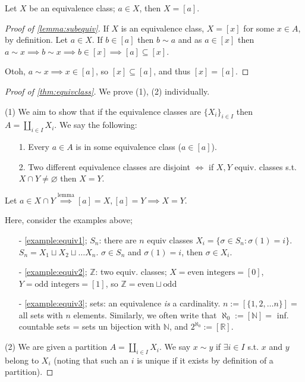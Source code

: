 \documentclass[12pt,oneside]{article}
\begin{document}
\begin{lemma}\label{lemma:subequiv}
  Let $X$ be an equivalence class; $a \in X$, then $X = [a]$.
\end{lemma}
\begin{proof}[Proof of \cref{lemma:subequiv}]
  If $X$ is an equivalence class, $X = [x]$ for some $x \in A$, by definition. Let $a \in X$. If $b \in [a]$ then $b \sim a$ and as $a \in [x]$ then $a \sim x \implies b \sim x \implies b \in [x] \implies [a] \subseteq [x]$.

  Otoh, $a \sim x \implies x \in [a]$, so $[x] \subseteq [a]$, and thus $[x] = [a]$.
\end{proof}

\begin{proof}[Proof of \cref{thm:equivclass}]
  We prove (1), (2) individually.

 (1) We aim to show that if the equivalence classes are $\{X_i\}_{i \in I}$ then $A = \amalg_{i \in I} X_i$. We say the following:
 \begin{itemize}
  \item[1.] Every $a \in A$ is in some equivalence class ($a \in [a]$).
  \item[2.] Two different equivalence classes are disjoint $\iff$ if $X,Y$ equiv. classes s.t. $X \cap Y \ne \varnothing$ then $X = Y$.\footnotemark
 \end{itemize}

 Let $a \in X \cap Y \overset{\text{lemma}}{\implies} [a] = X, [a] = Y \implies X = Y$.

 Here, consider the examples above;
 \begin{itemize}
  \item[-]\cref{example:equiv1}; $S_n$: there are $n$ equiv classes $X_i = \{\sigma \in S_n : \sigma(1) = i\}$. $S_n = X_1 \sqcup X_2 \sqcup \dots X_n$. $\sigma \in S_n$ and $\sigma(1) = i$, then $\sigma \in X_i$.
  \item[-] \cref{example:equiv2}; $\mathbb{Z}$: two equiv. classes; $X = \text{even integers} = [0]$, $Y = \text{odd integers} = [1]$, so $\mathbb{Z} = \text{even} \sqcup \text{odd}$
  \item[-] \cref{example:equiv3}; sets: an equivalence \textit{is} a cardinality. $n:=[\{1,2, \dots n\}] = $ all sets with $n$ elements. Similarly, we often write that $\aleph_0 := [\mathbb{N}] =$ inf. countable sets = sets un bijection with $\mathbb{N}$, and $2^{\aleph_0} := [\mathbb{R}]$.
 \end{itemize}

 (2) We are given a partition $A = \amalg_{i \in I} X_i$. We say $x \sim y$ if $\exists i \in I$ s.t. $x$ and $y$ belong to $X_i$ (noting that such an $i$ is unique if it exists by definition of a partition).


\end{proof}
\end{document}
